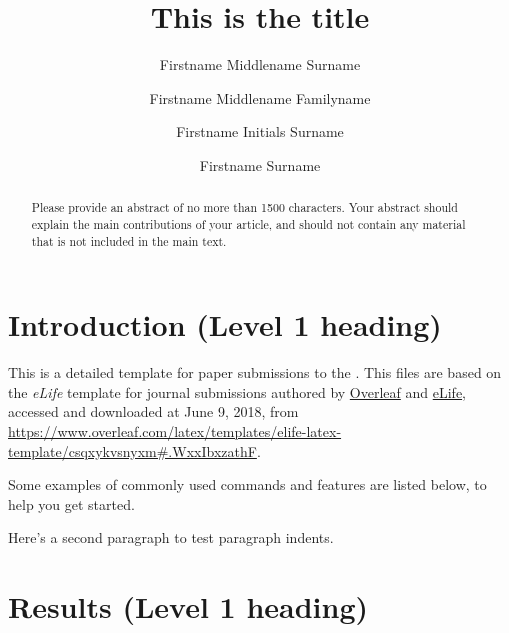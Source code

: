 \documentclass[9pt,lineno]{crone}
\title{This is the title}
\author[1*]{Firstname Middlename Surname}
\author[1,2\authfn{1}]{Firstname Middlename Familyname}
\author[2\authfn{2}]{Firstname Initials Surname}
\author[2*]{Firstname Surname}
\affil[1]{Institution 1}
\affil[2]{Institution 2}
\begin{document}
\maketitle

\begin{abstract}
Please provide an abstract of no more than 1500 characters. Your abstract should explain the main contributions of your article, and should not contain any material that is not included in the main text.
\end{abstract}


\section{Introduction (Level 1 heading)}

This is a detailed template for paper submissions to the \CRoNeVERSION{}. This files are based on the \textit{eLife} template for journal submissions authored by \href{https://www.overleaf.com}{Overleaf} and \href{https://www.elifesciences.com}{eLife}, accessed and downloaded at June 9, 2018, from \url{https://www.overleaf.com/latex/templates/elife-latex-template/csqxykvsnyxm#.WxxIbxzathF}.

Some examples of commonly used commands and features are listed below, to help you get started.

Here's a second paragraph to test paragraph indents. \lipsum[1]

\section{Results (Level 1 heading)}

\lipsum[2-3]
\end{document}
